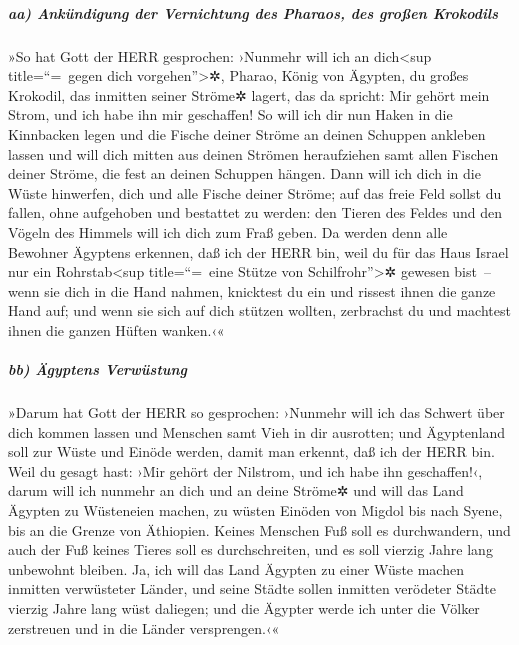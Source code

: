 \hypertarget{aa-ankuxfcndigung-der-vernichtung-des-pharaos-des-grouxdfen-krokodils}{%
\subparagraph{aa) Ankündigung der Vernichtung des Pharaos, des großen
Krokodils}\label{aa-ankuxfcndigung-der-vernichtung-des-pharaos-des-grouxdfen-krokodils}}

»So hat Gott der HERR gesprochen: ›Nunmehr will ich an
dich\textless sup title=``=~gegen dich vorgehen''\textgreater✲, Pharao,
König von Ägypten, du großes Krokodil, das inmitten seiner Ströme✲
lagert, das da spricht: Mir gehört mein Strom, und ich habe ihn mir
geschaffen! So will ich dir nun Haken in die Kinnbacken
legen und die Fische deiner Ströme an deinen Schuppen ankleben lassen
und will dich mitten aus deinen Strömen heraufziehen samt allen Fischen
deiner Ströme, die fest an deinen Schuppen hängen. Dann
will ich dich in die Wüste hinwerfen, dich und alle Fische deiner
Ströme; auf das freie Feld sollst du fallen, ohne aufgehoben und
bestattet zu werden: den Tieren des Feldes und den Vögeln des Himmels
will ich dich zum Fraß geben. Da werden denn alle Bewohner
Ägyptens erkennen, daß ich der HERR bin, weil du für das Haus Israel nur
ein Rohrstab\textless sup title=``=~eine Stütze von
Schilfrohr''\textgreater✲ gewesen bist~-- wenn sie dich in
die Hand nahmen, knicktest du ein und rissest ihnen die ganze Hand auf;
und wenn sie sich auf dich stützen wollten, zerbrachst du und machtest
ihnen die ganzen Hüften wanken.‹«

\hypertarget{bb-uxe4gyptens-verwuxfcstung}{%
\subparagraph{bb) Ägyptens
Verwüstung}\label{bb-uxe4gyptens-verwuxfcstung}}

»Darum hat Gott der HERR so gesprochen: ›Nunmehr will ich
das Schwert über dich kommen lassen und Menschen samt Vieh in dir
ausrotten; und Ägyptenland soll zur Wüste und Einöde
werden, damit man erkennt, daß ich der HERR bin. Weil du gesagt hast:
›Mir gehört der Nilstrom, und ich habe ihn geschaffen!‹,
darum will ich nunmehr an dich und an deine Ströme✲ und
will das Land Ägypten zu Wüsteneien machen, zu wüsten Einöden von Migdol
bis nach Syene, bis an die Grenze von Äthiopien. Keines
Menschen Fuß soll es durchwandern, und auch der Fuß keines Tieres soll
es durchschreiten, und es soll vierzig Jahre lang unbewohnt bleiben.
Ja, ich will das Land Ägypten zu einer Wüste machen
inmitten verwüsteter Länder, und seine Städte sollen inmitten verödeter
Städte vierzig Jahre lang wüst daliegen; und die Ägypter werde ich unter
die Völker zerstreuen und in die Länder versprengen.‹«

